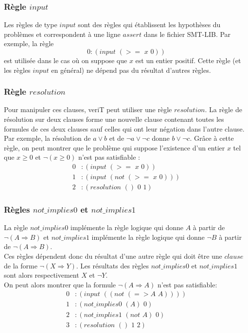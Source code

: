 \documentclass[11pt]{article}
\begin{document}
\subsubsection{Règle $input$}

Les règles de type $input$ sont des règles qui établissent les hypothèses du problèmes et correspondent à une ligne $assert$ dans le fichier SMT-LIB. Par exemple, la règle 
\[ 0:(input \,\, (>= \,\,x \,\,0)) \]
est utilisée dans le cas où on suppose que $x$ est un entier positif. Cette règle (et les règles $input$ en général) ne dépend pas du résultat d'autres règles.\\

\subsubsection{Règle $resolution$}

Pour manipuler ces clauses, veriT peut utiliser une règle $resolution$. La règle de résolution sur deux clauses forme une nouvelle clause contenant toutes les formules de ces deux clauses sauf celles qui ont leur négation dans l'autre clause. Par exemple, la résolution de $a \vee b$ et de $\neg a \vee \neg c$ donne $b \vee \neg c$. Grâce à cette règle, on peut montrer que le problème qui suppose l'existence d'un entier $x$ tel que $x \geq 0$ et $\neg (x \geq 0)$ n'est pas satisfiable : 
\begin{align*}
0&:(input \,\, (>= \,\,x \,\,0)) \\
1&:(input \,\, (not \,\, (>= \,\,x \,\,0))) \\
2&:(resolution \,\,() \,\,0\,\, 1)
\end{align*}


\subsubsection{Règles $not\_implies0$ et $not\_implies1$} \label{not_implies}
La règle $not\_implies0$ implémente la règle logique qui donne $A$ à partir de $\neg (A \Rightarrow B)$ et $not\_implies1$ implémente la règle logique qui donne $\neg B$ à partir de $\neg (A \Rightarrow B)$. \\

Ces règles dépendent donc du résultat d'une autre règle qui doit être une $clause$ de la forme $\neg (X \Rightarrow Y)$. Les résultats des règles $not\_implies0$ et $not\_implies1$ sont alors respectivement $X$ et $\neg Y$. \\

On peut alors montrer que la formule $\neg (A \Rightarrow A)$ n'est pas satisfiable:
\begin{align*}
  0&:(input\,\, ((not\,\, (=> A \,\,A)))) \\
  1&:(not\_implies0\,\, (A)\,\, 0) \\
  2&:(not\_implies1\,\, (not\,\, A) \,\,0) \\
  3&:(resolution\,\, ()\,\, 1\,\, 2)
\end{align*}
\end{document}
